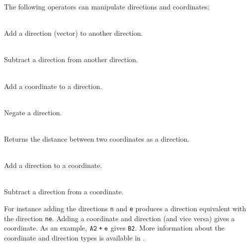 The following operators can manipulate directions and coordinates:

\begin{dlist}
  \item {} \\
    Add a direction (vector) to another direction.
  \item {} \\
    Subtract a direction from another direction.
  \item {} \\
    Add a coordinate to a direction.
  \item {} \\
    Negate a direction.
  \item {} \\
    Returns the distance between two coordinates as a direction.
  \item {} \\
    Add a direction to a coordinate. 
  \item {} \\
    Subtract a direction from a coordinate.
\end{dlist}

For instance adding the directions \texttt{n} and \texttt{e} produces a
direction equivalent with the direction \texttt{ne}. Adding a coordinate and
direction (and vice versa) gives a coordinate. As an example, $\texttt{A2} \;
\verb!+! \; \texttt{e}$ gives \texttt{B2}. More information about the coordinate
and direction types is available in .

